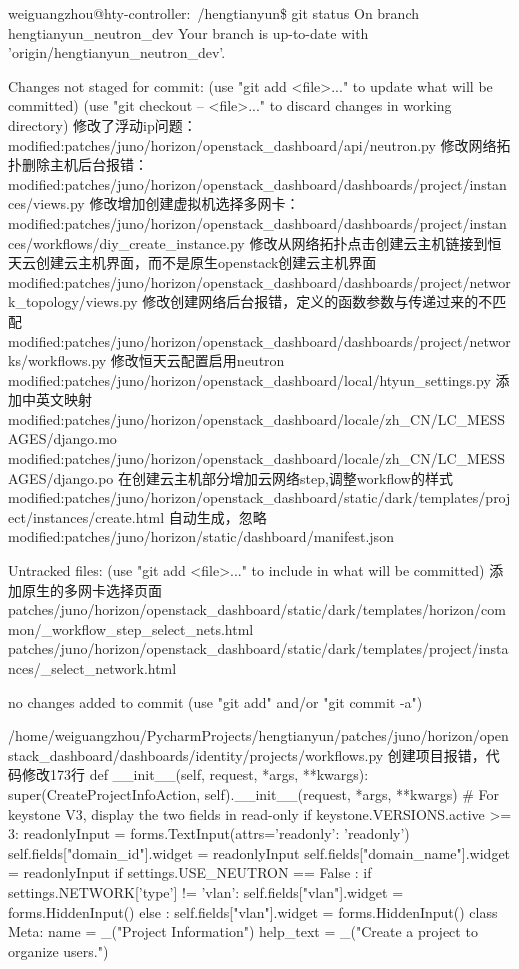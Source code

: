 weiguangzhou@hty-controller:~/hengtianyun\$ git status
On branch hengtianyun_neutron_dev
Your branch is up-to-date with 'origin/hengtianyun_neutron_dev'.

Changes not staged for commit:
  (use "git add <file>..." to update what will be committed)
  (use "git checkout -- <file>..." to discard changes in working directory)
    修改了浮动ip问题：
	modified:patches/juno/horizon/openstack_dashboard/api/neutron.py
    修改网络拓扑删除主机后台报错：
	modified:patches/juno/horizon/openstack_dashboard/dashboards/project/instances/views.py
	修改增加创建虚拟机选择多网卡：
    modified:patches/juno/horizon/openstack_dashboard/dashboards/project/instances/workflows/diy_create_instance.py
	修改从网络拓扑点击创建云主机链接到恒天云创建云主机界面，而不是原生openstack创建云主机界面
    modified:patches/juno/horizon/openstack_dashboard/dashboards/project/network_topology/views.py
    修改创建网络后台报错，定义的函数参数与传递过来的不匹配
	modified:patches/juno/horizon/openstack_dashboard/dashboards/project/networks/workflows.py
    修改恒天云配置启用neutron
	modified:patches/juno/horizon/openstack_dashboard/local/htyun_settings.py
    添加中英文映射
	modified:patches/juno/horizon/openstack_dashboard/locale/zh_CN/LC_MESSAGES/django.mo
	modified:patches/juno/horizon/openstack_dashboard/locale/zh_CN/LC_MESSAGES/django.po
	在创建云主机部分增加云网络step,调整workflow的样式
	modified:patches/juno/horizon/openstack_dashboard/static/dark/templates/project/instances/create.html
	自动生成，忽略
	modified:patches/juno/horizon/static/dashboard/manifest.json

Untracked files:
  (use "git add <file>..." to include in what will be committed)
    添加原生的多网卡选择页面
	patches/juno/horizon/openstack_dashboard/static/dark/templates/horizon/common/_workflow_step_select_nets.html
	patches/juno/horizon/openstack_dashboard/static/dark/templates/project/instances/_select_network.html

no changes added to commit (use "git add" and/or "git commit -a")





/home/weiguangzhou/PycharmProjects/hengtianyun/patches/juno/horizon/openstack_dashboard/dashboards/identity/projects/workflows.py
创建项目报错，代码修改173行
 def __init__(self, request, *args, **kwargs):
        super(CreateProjectInfoAction, self).__init__(request,
                                                      *args,
                                                      **kwargs)
        # For keystone V3, display the two fields in read-only
        if keystone.VERSIONS.active >= 3:
            readonlyInput = forms.TextInput(attrs={'readonly': 'readonly'})
            self.fields["domain_id"].widget = readonlyInput
            self.fields["domain_name"].widget = readonlyInput
        if settings.USE_NEUTRON == False :
            if settings.NETWORK['type'] != 'vlan':
                self.fields["vlan"].widget = forms.HiddenInput()
        else :
            self.fields["vlan"].widget = forms.HiddenInput()
    class Meta:
        name = _("Project Information")
        help_text = _("Create a project to organize users.")


